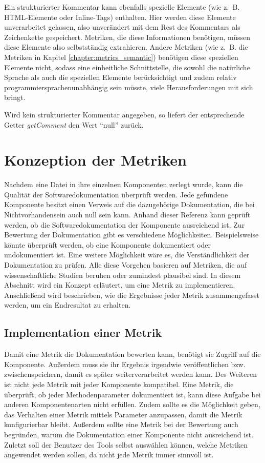  Ein strukturierter Kommentar kann ebenfalls spezielle Elemente (wie z.~B. \ac{HTML}-Elemente oder Inline-Tags) enthalten. Hier werden diese Elemente unverarbeitet gelassen, also unverändert mit dem Rest des Kommentars als Zeichenkette gespeichert. Metriken, die diese Informationen benötigen, müssen diese Elemente also selbstständig extrahieren. Andere Metriken (wie z.~B. die Metriken in Kapitel \ref{chapter:metrics_semantic}) benötigen diese speziellen Elemente nicht, sodass eine einheitliche Schnittstelle, die sowohl die natürliche Sprache als auch die speziellen Elemente berücksichtigt und  zudem relativ programmiersprachenunabhängig sein müsste, viele Herausforderungen mit sich bringt.   
 
 Wird kein strukturierter Kommentar angegeben, so liefert der entsprechende Getter \textit{getComment} den Wert \enquote{null} zurück. 
\section{Konzeption der Metriken}\label{chapter:metric_conception}
Nachdem eine Datei in ihre einzelnen Komponenten zerlegt wurde, kann die Qualität der Softwaredokumentation überprüft werden. Jede gefundene Komponente besitzt einen Verweis auf die dazugehörige Dokumentation, die bei Nichtvorhandensein auch null sein kann. Anhand dieser Referenz kann geprüft werden, ob die Softwaredokumentation der Komponente ausreichend ist. Zur Bewertung der Dokumentation gibt es verschiedene  Möglichkeiten. Beispielsweise könnte überprüft werden, ob eine Komponente dokumentiert oder undokumentiert ist. Eine weitere Möglichkeit wäre es, die Verständlichkeit der Dokumentation zu prüfen. Alle diese Vorgehen basieren auf Metriken, die auf wissenschaftliche Studien beruhen oder zumindest plausibel sind. In diesem Abschnitt wird ein Konzept erläutert, um eine Metrik zu implementieren. Anschließend wird beschrieben, wie die Ergebnisse jeder Metrik zusammengefasst werden, um ein Endresultat zu erhalten. 

\subsection{Implementation einer Metrik}\label{chapter:metric_impl}
Damit eine Metrik die Dokumentation bewerten kann, benötigt sie Zugriff auf die Komponente. Außerdem muss sie ihr Ergebnis irgendwie veröffentlichen bzw. zwischenspeichern, damit es später weiterverarbeitet werden kann. Des Weiteren ist nicht jede Metrik mit jeder Komponente kompatibel. Eine Metrik, die überprüft, ob jeder Methodenparameter dokumentiert ist, kann diese Aufgabe bei anderen Komponentenarten nicht erfüllen. Zudem sollte es die Möglichkeit geben, das Verhalten einer Metrik mittels Parameter anzupassen, damit die Metrik konfigurierbar bleibt. Außerdem sollte eine Metrik bei der Bewertung auch begründen, warum die Dokumentation einer Komponente nicht ausreichend ist. Zuletzt soll der Benutzer des Tools selbst auswählen können, welche Metriken angewendet werden sollen, da nicht jede Metrik immer sinnvoll ist. 

